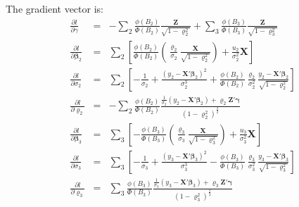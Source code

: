 \documentclass[a4paper]{article}
\begin{document}
The gradient vector is:
\begin{eqnarray}
\frac{\partial l}{\partial \gamma} & = &
  -\sum_2 \frac{\phi(B_2)}{\Phi(B_2)}
    \frac{\bm{Z}}{\sqrt{1-\varrho_2^2}}
  +\sum_3 \frac{\phi(B_3)}{\Phi(B_3)}
    \frac{\bm{Z}}{\sqrt{1-\varrho_3^2}} \\
\frac{\partial l}{\partial \bm{\beta}_2} & = &
  \sum_2 \left[
    \frac{\phi(B_2)}{\Phi(B_2)} \left(
      \frac{\varrho_2}{\sigma_2}
      \frac{\bm{X}}{\sqrt{1-\varrho_2^2}} \right)
    +\frac{u_2}{\sigma_2^2}\bm{X}
    \right] \\
\frac{\partial l}{\partial \sigma_2} & = &
  \sum_2 \left[
    -\frac{1}{\sigma_2}
    +\frac{ \left( y_2 - \bm{X}'\bm{\beta}_2 \right)^2}
      {\sigma_2^3}
    +\frac{\phi(B_2)}{\Phi(B_2)}
    \frac{\varrho_2}{\sigma_2^2}
    \frac{y_2 - \bm{X}'\bm{\beta}_2}{\sqrt{1-\varrho_2^2}}
    \right] \\
\frac{\partial l}{\partial \varrho_2} & = &
  -\sum_2
    \frac{\phi(B_2)}{\Phi(B_2)}
    \frac{ \displaystyle \frac{1}{\sigma_2}
        ( y_2 - \bm{X}'\bm{\beta}_2) + \varrho_2 \bm{Z}'\bm{\gamma}}
      {( 1 - \varrho_2^2)^{\frac{3}{2}}}\\
\frac{\partial l}{\partial \bm{\beta}_3} & = &
  \sum_3 \left[
    -\frac{\phi(B_3)}{\Phi(B_3)} \left(
      \frac{\varrho_3}{\sigma_3}
      \frac{\bm{X}}{\sqrt{1-\varrho_3^2}} \right)
    +\frac{u_3}{\sigma_3^2}\bm{X}
    \right] \\
\frac{\partial l}{\partial \sigma_3} & = &
  \sum_3 \left[
    -\frac{1}{\sigma_3}
    +\frac{ \left( y_3 - \bm{X}'\bm{\beta}_3 \right)^2}
      {\sigma_3^3}
    -\frac{\phi(B_3)}{\Phi(B_3)}
    \frac{\varrho_3}{\sigma_3^2}
    \frac{y_3 - \bm{X}'\bm{\beta}_3}{\sqrt{1-\varrho_3^2}}
    \right] \\
\frac{\partial l}{\partial \varrho_3} & = &
  \sum_3
    \frac{\phi(B_3)}{\Phi(B_3)}
    \frac{ \displaystyle \frac{1}{\sigma_3}
        ( y_3 - \bm{X}'\bm{\beta}_3) + \varrho_3 \bm{Z}'\bm{\gamma}}
      {( 1 - \varrho_3^2)^{\frac{3}{2}}}
\end{eqnarray}
\end{document}
